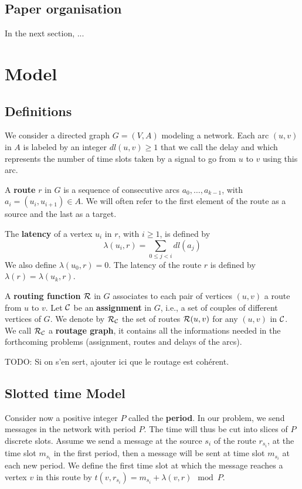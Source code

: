 \documentclass[a4paper,10pt]{article}
\newcommand{\todo}[1]{{\color{red} TODO: {#1}}}
\begin{document}
\subsection*{Paper organisation}
 In the next section, ...


  

\section{Model}

  \subsection{Definitions}
  

  
	We consider a directed graph $G=(V,A)$ modeling a network. Each arc  $(u,v)$ in $A$ is labeled by an integer $dl(u,v) \geq 1$ that we call the delay and
	which represents the number of time slots taken by a signal to go from $u$ to $v$ using this arc. 
	
      A {\bf route} $r$ in $G$ is a sequence of consecutive arcs $a_0, \ldots , a_{k-1}$, with $a_i=(u_i,u_{i+1}) \in A$. 
      We will often refer to the first element of the route as a source and the last as a target.
      
      The {\bf latency} of a vertex $u_i$ in $r$, with $i \geq 1$, is defined by $$\lambda(u_i,r)= \sum\limits_{0 \leq j <i} dl(a_j)$$ We also define $\lambda(u_0,r)=0$.
      The latency of the route $r$ is defined by $\lambda (r)= \lambda (u_k,r)$.
      

      A {\bf routing function} $\cal R$ in $G$ associates to each pair of vertices $(u,v)$ a route from $u$ to $v$. Let $\cal C$ be an {\bf assignment} in $G$, i.e., a set of couples of different vertices of $G$. We denote by $\cal R_{\cal C}$ the set of routes ${\cal R}(u,v)$ for any $(u,v)$ in $\cal C$. We call $\cal R_{\cal C}$ a {\bf routage graph}, it contains all the informations needed in the forthcoming problems (assignment, routes and delays of the arcs). 
      

      \todo{Si on s'en sert, ajouter ici que le routage est cohérent.}

   \subsection{Slotted time Model}
      Consider now a positive integer $P$ called the {\bf period}. In our problem, we send messages in the network with period $P$. The time will thus be cut into slices of $P$ discrete slots. Assume we send a message at the source $s_i$ of the route $r_{s_i}$, at the time slot $m_{s_i}$ in the first period, then a message will be sent at time slot $m_{s_i}$ at each new period. We define the first time slot at which the message reaches a vertex $v$ in this route by $t(v,r_{s_i}) = m_{s_i} + \lambda(v,r) \mod P$. 
\end{document}
